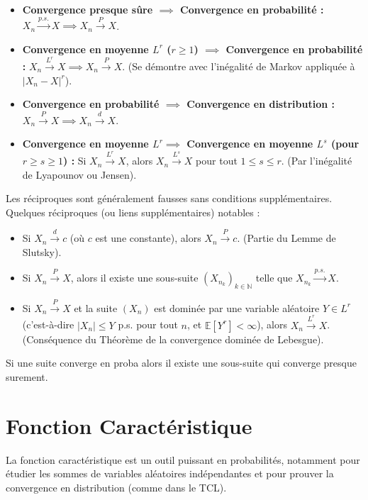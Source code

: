 \begin{itemize}
    \item \textbf{Convergence presque sûre $\implies$ Convergence en probabilité :} $X_n \xrightarrow{p.s.} X \implies X_n \xrightarrow{P} X$.
    \item \textbf{Convergence en moyenne $L^r$ ($r \ge 1$) $\implies$ Convergence en probabilité :} $X_n \xrightarrow{L^r} X \implies X_n \xrightarrow{P} X$. (Se démontre avec l'inégalité de Markov appliquée à $|X_n - X|^r$).
    \item \textbf{Convergence en probabilité $\implies$ Convergence en distribution :} $X_n \xrightarrow{P} X \implies X_n \xrightarrow{d} X$.
    \item \textbf{Convergence en moyenne $L^r \implies$ Convergence en moyenne $L^s$ (pour $r \ge s \ge 1$) :} Si $X_n \xrightarrow{L^r} X$, alors $X_n \xrightarrow{L^s} X$ pour tout $1 \le s \le r$. (Par l'inégalité de Lyapounov ou Jensen).
\end{itemize}

Les réciproques sont généralement fausses sans conditions supplémentaires. Quelques réciproques (ou liens supplémentaires) notables :

\begin{itemize}
    \item Si $X_n \xrightarrow{d} c$ (où $c$ est une constante), alors $X_n \xrightarrow{P} c$. (Partie du Lemme de Slutsky).
    \item Si $X_n \xrightarrow{P} X$, alors il existe une sous-suite $(X_{n_k})_{k \in \mathbb{N}}$ telle que $X_{n_k} \xrightarrow{p.s.} X$.
    \item Si $X_n \xrightarrow{P} X$ et la suite $(X_n)$ est dominée par une variable aléatoire $Y \in L^r$ (c'est-à-dire $|X_n| \le Y$ p.s. pour tout $n$, et $\mathbb{E}[Y^r] < \infty$), alors $X_n \xrightarrow{L^r} X$. (Conséquence du Théorème de la convergence dominée de Lebesgue).
\end{itemize}

\begin{proposition}
    Si une suite converge en proba alors il existe une sous-suite qui converge presque surement.
\end{proposition}
\section{Fonction Caractéristique}

La fonction caractéristique est un outil puissant en probabilités, notamment pour étudier les sommes de variables aléatoires indépendantes et pour prouver la convergence en distribution (comme dans le TCL).

